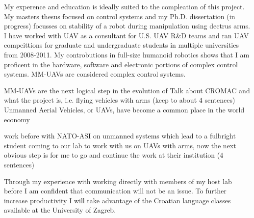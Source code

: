 \documentclass[12pt]{article}
\begin{document}
My experence and education is ideally suited to the compleation of this project.  My masters thesus focused on control systems and my Ph.D. dissertation (in progress) focusses on stability of a robot during manipulation using dectrus arms.  I have worked with UAV as a consultant for U.S. UAV R\&D teams and ran UAV compeittions for graduate and undergraduate students in multiple universities from 2008-2011.  My controbutions in full-size humanoid robotics shows that I am proficent in the hardware, software and electronic portions of complex control systems.  MM-UAVs are considered complex control systems.



MM-UAVs are the next logical step in the evolution of 
Talk about CROMAC and what the project is, i.e. flying vehicles with arms (keep to about 4 sentences)
Unmanned Aerial Vehicles, or UAVs, have become a common place in the world economy



work before with NATO-ASI on unmanned systems which lead to a fulbright student coming to our lab 
to work with us on UAVs with arms, now the next obvious step is for me to go and continue the work at 
their institution (4 sentences)

Through my experience with working directly with members of my host lab before I am confident that communication will not be an issue.  To further increase productivity I will take advantage of the Croatian language classes available at the University of Zagreb.
\end{document}
